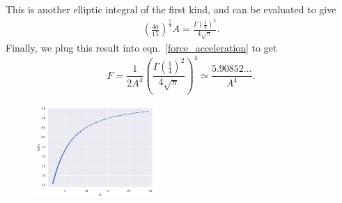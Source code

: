 \documentclass[11pt, oneside]{article}  	%
\numberwithin{equation}{section}
\begin{document}
This is another elliptic integral of the first kind, and can be evaluated to give \cite{gradshtein_table_2007}
\begin{align}
    \left( \frac{4a}{15}\right)^{\frac{1}{4}} A = \frac{\Gamma\left ( \frac{1}{4}\right ) ^2}{4 \sqrt{\pi}}.
\end{align}
Finally, we plug this result into eqn.~\ref{force_acceleration} to get
\begin{equation} \label{prediction_mirror}
    F =\frac{1}{2A^4}\left (\frac{\Gamma(\frac{1}{4})^2}{4\sqrt{\pi}}  \right )^4 \simeq \frac{5.90852...}{A^4}.
\end{equation}

\begin{figure}[t]
    \vspace{-10pt}
    \centering
    \includegraphics[width=0.42\textwidth]{coefficient_scatter_kmk.png}
     \label{coefficient_scatter_kmk}
    \vspace{+10pt}
\end{figure}
\end{document}
